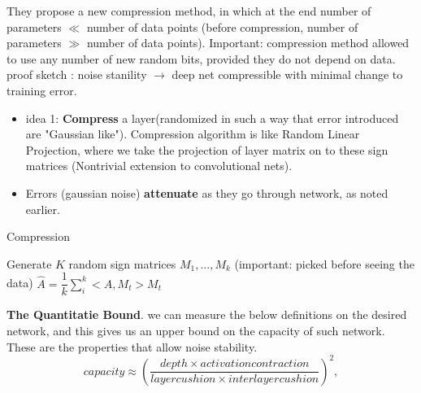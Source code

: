 \documentclass{article} %
\newcommand\fakeparagraph[1]{\par\noindent\textbf{{#1}}.\xspace}
\begin{document}
\begin{itemize}
They propose a new compression method, in which at the end number of parameters $\ll$ number of data points (before compression, number of parameters $\gg$ number of data points). Important: compression method allowed to use any number of new random bits, provided they do not depend on data.\\ 
proof sketch : noise stanility $\rightarrow$ deep net compressible with minimal change to training error.
\begin{itemize}
\item idea 1: \textbf{Compress} a layer(randomized in such a way that error introduced are "Gaussian like"). Compression algorithm is like Random Linear Projection, where we take the projection of layer matrix on to these sign matrices (Nontrivial extension to convolutional nets).
\item  Errors (gaussian noise) \textbf{attenuate} as they go through network, as noted earlier.
\end{itemize}

\begin{algorithm}[h]
\caption{Compression }
\label{alg:LT}
\begin{algorithmic}[1]
\State Generate $K$ random sign matrices $M_1, ..., M_k$ (important: picked before seeing the data)
\State $\hat{A} = \dfrac{1}{k}\sum_{i}^{k}<A,M_t>M_t$
\end{algorithmic}
\end{algorithm}

\end{itemize}
\fakeparagraph{The Quantitatie Bound} we can measure the below definitions on the desired network, and this gives us an upper bound on the capacity of such network. These are the properties that allow noise stability.
\begin{equation}
  \label{eq:capacity_compression}
	capacity \approx (\frac{depth \times activation contraction}{layer cushion \times interlayer cushion})^2,
\end{equation}
\end{document}
